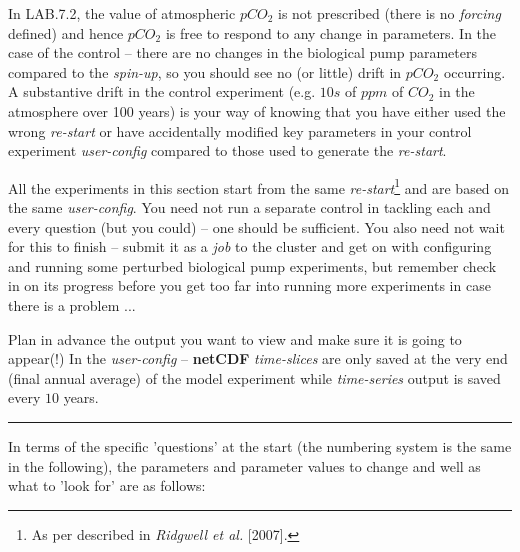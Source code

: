 In \textsf{\footnotesize LAB.7.2}, the value of atmospheric  \(pCO_{2}\) is not prescribed (there is no \textit{forcing} defined) and hence \(pCO_{2}\) is free to respond to any change in parameters. In the case of the control -- there are no changes in the biological pump parameters compared to the \textit{spin-up}, so you should see no (or little) drift in \(pCO_{2}\) occurring. A substantive drift in the control experiment (e.g. \(10s\) of \(ppm\) of \(CO_{2}\) in the atmosphere over 100 years) is your way of knowing that you have either used the wrong \textit{re-start} or have accidentally modified key parameters in your control experiment \textit{user-config} compared to those used to generate the \textit{re-start}. 

All the experiments in this section start from the same \textit{re-start}\footnote{As per described in \textit{Ridgwell et al.} [2007].} and are based on the same \textit{user-config}. You need not run a separate control in tackling each and every question (but you could) -- one should be sufficient. You also need not wait for this to finish -- submit it as a \textit{job} to the cluster and get on with configuring and running some perturbed biological pump  experiments, but remember check in on its progress before you get too far into running more experiments in case there is a problem ...

\vspace{1mm}
Plan in advance  the output you want to view and make sure it is going to appear(!) In the \textit{user-config} -- \textbf{netCDF} \textit{time-slices} are only saved at the very end (final annual average) of the model experiment while \textit{time-series} output is saved every $10$ years.

\vspace{1mm}\noindent\rule{4cm}{0.5pt}\vspace{2mm}

\noindent In terms of the specific 'questions' at the start (the numbering system is the same in the following), the parameters and parameter values to change and well as what to 'look for' are as follows:

\newpage

